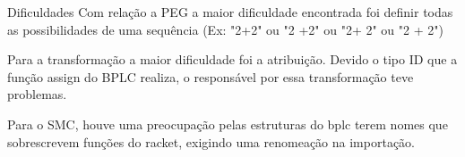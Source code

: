\documentclass{beamer}
\begin{document}
\begin{frame}{Dificuldades}
Com relação a PEG a maior dificuldade encontrada foi definir todas as possibilidades de uma sequência (Ex: "2+2" ou 
"2 +2" ou "2+ 2" ou "2 + 2")

Para a transformação a maior dificuldade foi a atribuição. Devido o tipo ID que a função assign do BPLC realiza, o responsável por essa transformação teve problemas.

 Para o SMC, houve uma preocupação pelas estruturas do bplc terem nomes que sobrescrevem funções do racket, exigindo uma renomeação na importação.


\end{frame}
\end{document}
